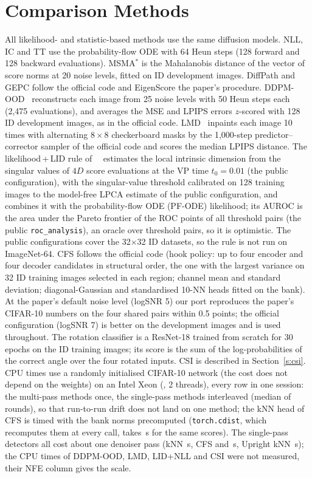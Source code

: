\documentclass[10pt]{article}
\begin{document}
\section{Comparison Methods}
All likelihood- and statistic-based methods use the same diffusion models. NLL, IC and TT use the probability-flow ODE with 64 Heun steps (128 forward and 128 backward evaluations). MSMA$^{*}$ is the Mahalanobis distance of the vector of score norms at 20 noise levels, fitted on ID development images. DiffPath and GEPC follow the official code and EigenScore the paper's procedure. DDPM-OOD~\cite{graham2023ddpmood} reconstructs each image from 25 noise levels with 50 Heun steps each (2{,}475 evaluations), and averages the MSE and LPIPS errors $z$-scored with 128 ID development images, as in the official code. LMD~\cite{liu2023lmd} inpaints each image 10 times with alternating $8\times8$ checkerboard masks by the 1{,}000-step predictor--corrector sampler of the official code and scores the median LPIPS distance. The likelihood\,+\,LID rule of~\citeauthor{kamkari2024geometric}~ estimates the local intrinsic dimension from the singular values of $4D$ score evaluations at the VP time $t_0=0.01$ (the public configuration), with the singular-value threshold calibrated on 128 training images to the model-free LPCA estimate of the public configuration, and combines it with the probability-flow ODE (PF-ODE) likelihood; its AUROC is the area under the Pareto frontier of the ROC points of all threshold pairs (the public \texttt{roc\_analysis}), an oracle over threshold pairs, so it is optimistic. The public configurations cover the 32$\times$32 ID datasets, so the rule is not run on ImageNet-64. CFS follows the official code (hook policy: up to four encoder and four decoder candidates in structural order, the one with the largest variance on 32 ID training images selected in each region; channel mean and standard deviation; diagonal-Gaussian and standardised 10-NN heads fitted on the bank). At the paper's default noise level (logSNR 5) our port reproduces the paper's CIFAR-10 numbers on the four shared pairs within 0.5 points; the official configuration (logSNR 7) is better on the development images and is used throughout. The rotation classifier is a ResNet-18 trained from scratch for 30 epochs on the ID training images; its score is the sum of the log-probabilities of the correct angle over the four rotated inputs. CSI is described in Section~\ref{s:csi}. CPU times use a randomly initialised CIFAR-10 network (the cost does not depend on the weights) on an Intel Xeon (\cpuGHz, 2 threads), every row in one session: the multi-pass methods once, the single-pass methods interleaved (median of \cpuReps{} rounds), so that run-to-run drift does not land on one method; the kNN head of CFS is timed with the bank norms precomputed (\texttt{torch.cdist}, which recomputes them at every call, takes \cpuCfsKnnCdist\,s for the same scores). The single-pass detectors all cost about one denoiser pass (kNN \cpuKnnBasic\,s, CFS \cpuCfs{} and \cpuCfsKnn\,s, Upright kNN \cpuOurs\,s); the CPU times of DDPM-OOD, LMD, LID+NLL and CSI were not measured, their NFE column gives the scale.
\end{document}
